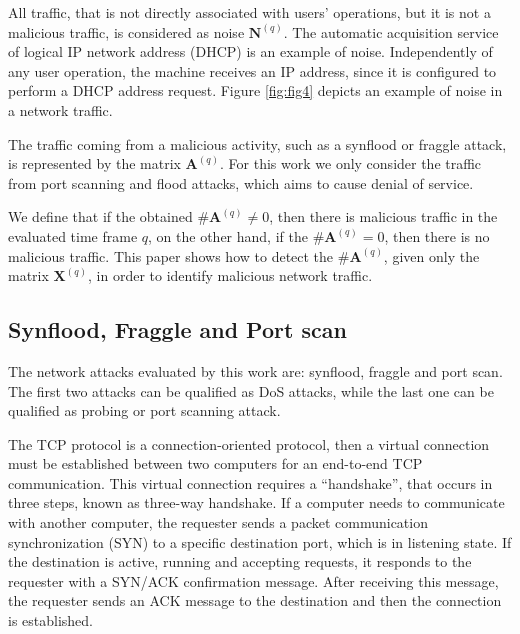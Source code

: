 \documentclass{bmcart}
\begin{document}

All traffic, that is not directly associated with users' operations, but it is not a malicious traffic, is considered as noise $\boldsymbol{N}^{(q)}$. The automatic acquisition service of logical IP network address (DHCP) is an example of noise. Independently of any user operation, the machine receives an IP address, since it is configured to perform a DHCP address request. Figure \ref{fig:fig4} depicts an example of noise in a network traffic.


The traffic coming from a malicious activity, such as a synflood or fraggle attack, is represented by the matrix $\boldsymbol{A}^{(q)}$. For this work we only consider the traffic from port scanning and flood attacks, which aims to cause denial of service. 

We define that if the obtained $\#\boldsymbol{A}^{(q)} ≠ 0$, then there is malicious traffic in the evaluated time frame $q$, on the other hand, if the $\#\boldsymbol{A}^{(q)} = 0$, then there is no malicious traffic. This paper shows how to detect the $\#\boldsymbol{A}^{(q)}$, given only the matrix $\boldsymbol{X}^{(q)}$, in order to identify malicious network traffic.

\subsection{Synflood, Fraggle and Port scan}
\label{sec:SynfloodFraggleandPortscan}

The network attacks evaluated by this work are: synflood, fraggle and port scan. The first two attacks can be qualified as DoS attacks, while the last one can be qualified  as probing or port scanning attack.

The TCP protocol is a connection-oriented protocol, then a virtual connection must be established between two computers for an end-to-end TCP communication. This virtual connection requires a ``handshake'', that occurs in three steps, known as three-way handshake. If a computer needs to communicate with another computer, the requester sends a packet communication synchronization (SYN) to a specific destination port, which is in listening state. If the destination is active, running and accepting requests, it responds to the requester with a SYN/ACK confirmation message. After receiving this message, the requester sends an ACK message to the destination and then the connection is established.
\end{document}
